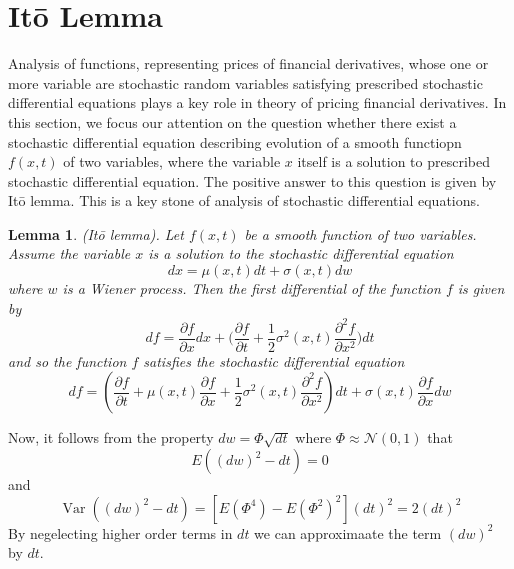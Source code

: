 \documentclass[a4paper]{article}
\newtheorem{lemma}[theorem]{Lemma}
\begin{document}
\section{It\={o} Lemma}
Analysis of functions, representing prices of financial derivatives, whose one or more variable are stochastic random variables satisfying prescribed stochastic differential equations
plays a key role in theory of pricing financial derivatives. In this section, we focus our attention on the question whether there exist a stochastic differential equation 
describing evolution of a smooth functiopn $f(x,t)$ of two variables, where the variable $x$ itself is a solution to prescribed stochastic differential equation.
The positive answer to this question is given by It\={o} lemma. This is a key stone of analysis of stochastic differential equations.
\begin{lemma}
    (It\={o} lemma). Let $f(x,t)$ be a smooth function of two variables. Assume the variable $x$ is a solution to the stochastic differential equation
    \begin{equation}
        dx = \mu(x,t) dt + \sigma(x,t) dw
    \end{equation}
    where $w$ is a Wiener process. Then the first differential of the function $f$ is given by
    \begin{equation}
        df = \frac{\partial f}{\partial x} dx + \bigg( \frac{\partial f}{\partial t} + \frac{1}{2}\sigma^2(x, t) \frac{\partial^2 f}{\partial x^2} \bigg) dt
    \end{equation}
    and so the function $f$ satisfies the stochastic differential equation
    \begin{equation}
        d f=\left(\frac{\partial f}{\partial t}+\mu(x, t) \frac{\partial f}{\partial x}+\frac{1}{2} \sigma^{2}(x, t) \frac{\partial^{2} f}{\partial x^{2}}\right) d t+\sigma(x, t) \frac{\partial f}{\partial x} d w
    \end{equation}
\end{lemma}
Now, it follows from the property $dw = \Phi\sqrt{dt}$ where $\Phi \approx \mathcal{N}(0, 1)$ that 
\begin{equation}
    E\left((d w)^{2}-d t\right)=0
\end{equation}
and
\begin{equation}
    \operatorname{Var}\left((d w)^{2}-d t\right)=\left[E\left(\Phi^{4}\right)-E\left(\Phi^{2}\right)^{2}\right](d t)^{2}=2(d t)^{2}
\end{equation}
By negelecting higher order terms in $dt$ we can approximaate the term $(dw)^2$ by $dt$.
\end{document}
